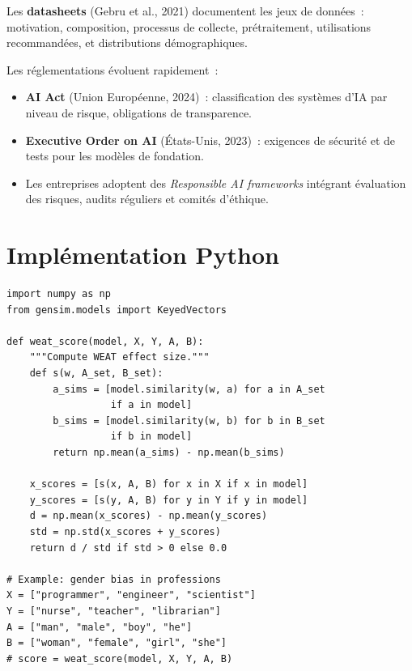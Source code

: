 \begin{definition}
Les \textbf{datasheets} (Gebru et al., 2021) documentent les jeux de
donn\'ees~: motivation, composition, processus de collecte,
pr\'etraitement, utilisations recommand\'ees, et distributions
d\'emographiques.
\end{definition}

\begin{remarque}
Les r\'eglementations \'evoluent rapidement~:
\begin{itemize}
    \item \textbf{AI Act} (Union Europ\'eenne, 2024)~: classification
    des syst\`emes d'IA par niveau de risque, obligations de transparence.
    \item \textbf{Executive Order on AI} (\'Etats-Unis, 2023)~: exigences
    de s\'ecurit\'e et de tests pour les mod\`eles de fondation.
    \item Les entreprises adoptent des \emph{Responsible AI frameworks}
    int\'egrant \'evaluation des risques, audits r\'eguliers et comit\'es
    d'\'ethique.
\end{itemize}
\end{remarque}

\section{Impl\'ementation Python}
\label{sec:ethique:code}

\begin{codeblock}[title=\textbf{D\'etection de biais dans les embeddings}]
\begin{verbatim}
import numpy as np
from gensim.models import KeyedVectors

def weat_score(model, X, Y, A, B):
    """Compute WEAT effect size."""
    def s(w, A_set, B_set):
        a_sims = [model.similarity(w, a) for a in A_set
                  if a in model]
        b_sims = [model.similarity(w, b) for b in B_set
                  if b in model]
        return np.mean(a_sims) - np.mean(b_sims)

    x_scores = [s(x, A, B) for x in X if x in model]
    y_scores = [s(y, A, B) for y in Y if y in model]
    d = np.mean(x_scores) - np.mean(y_scores)
    std = np.std(x_scores + y_scores)
    return d / std if std > 0 else 0.0

# Example: gender bias in professions
X = ["programmer", "engineer", "scientist"]
Y = ["nurse", "teacher", "librarian"]
A = ["man", "male", "boy", "he"]
B = ["woman", "female", "girl", "she"]
# score = weat_score(model, X, Y, A, B)
\end{verbatim}
\end{codeblock}

